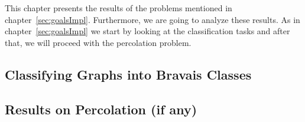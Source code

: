 This chapter presents the results of the problems mentioned in chapter~\ref{sec:goalsImpl}.
Furthermore, we are going to analyze these results. As in chapter~\ref{sec:goalsImpl} we start
by looking at the classification tasks and after that, we will proceed with the percolation problem.

\subsection{Classifying Graphs into Bravais Classes}


\subsection{Results on Percolation (if any)}
